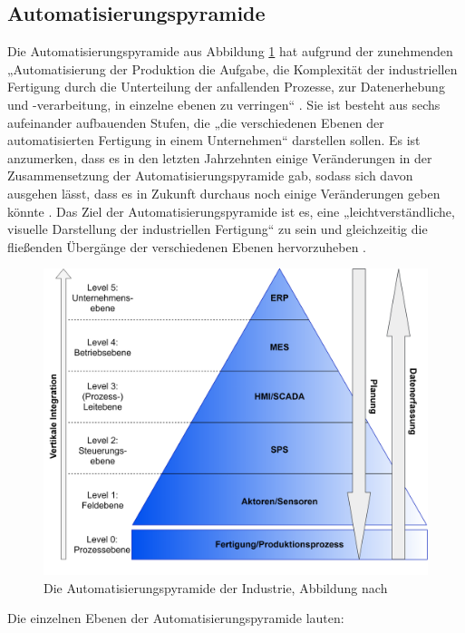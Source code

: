 \subsection{Automatisierungspyramide}\label{sec:Automatisierungspyramide}
Die Automatisierungspyramide aus Abbildung \ref{fig:Automatisierungspyramide} hat aufgrund der zunehmenden „Automatisierung der Produktion die Aufgabe, die Komplexität der industriellen Fertigung durch die Unterteilung der anfallenden Prozesse, zur Datenerhebung und -verarbeitung, in einzelne ebenen zu verringen“ \cite[S.49]{14}. Sie ist besteht aus sechs aufeinander aufbauenden Stufen, die „die verschiedenen Ebenen der automatisierten Fertigung in einem Unternehmen“ \cite[S.49]{14} darstellen sollen. Es ist anzumerken, dass es in den letzten Jahrzehnten einige Veränderungen in der Zusammensetzung der Automatisierungspyramide gab, sodass sich davon ausgehen lässt, dass es in Zukunft durchaus noch einige Veränderungen geben könnte \cite[S.49]{14}. Das Ziel der Automatisierungspyramide ist es, eine „leichtverständliche, visuelle Darstellung der industriellen Fertigung“ \cite[S.49]{14} zu sein und gleichzeitig die fließenden Übergänge der verschiedenen Ebenen hervorzuheben \cite[S.49]{14}.
\newpage
\begin{figure}[h]
	\centering
	\includegraphics[width=0.8\linewidth]{Bilder/A9_Automatisierungspyramide}
	\caption{Die Automatisierungspyramide der Industrie, Abbildung nach \cite[S.49]{14}}
	\label{fig:Automatisierungspyramide}
\end{figure}
\noindent Die einzelnen Ebenen der Automatisierungspyramide lauten:
